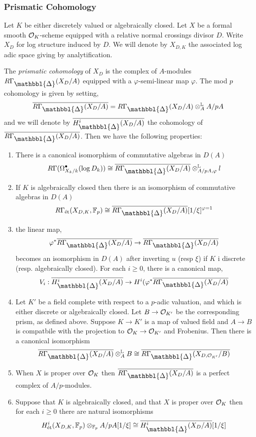 \documentclass[12pt]{article}
\newcommand{\Prism}{{\mathlarger{\mathbbl{\Delta}}}}
\begin{document}
\subsubsection{Prismatic Cohomology}

Let $K$ be either discretely valued or algebraically closed. Let $X$ be a formal smooth $\mathcal{O}_K$-scheme equipped with a relative normal crossings divisor $D$. Write $X_D$ for log structure induced by $D$. We will denote by $X_{D,K}$ the associated log adic space giving by analytification. 
\par 
The \textit{prismatic cohomology} of $X_D$ is the complex of $A$-modules $R \Gamma_{\Prism}(X_D/A)$ equipped with a $\varphi$-semi-linear map $\varphi$. The mod $p$ cohomology is given by setting,
\[ \ol{R \Gamma_{\Prism}(X_D/A)} = R \Gamma_{\Prism}(X_D/A) \ot_A^{\LL} A / p A \]
and we will denote by $\ol{H^i_{\Prism}(X_D/A)}$ the cohomology of $\ol{R \Gamma_{\Prism}(X_D/A)}$. Then we have the following properties:
\begin{enumerate}
\item There is a canonical isomorphism of commutative algebras in $D(A)$
\[ R \Gamma(\Omega^\bullet_{X_k/k}(\log{D_k})) \cong \ol{R \Gamma_{\Prism}(X_D/A)} \ot^{\LL}_{A/pA, \varphi} l \]
\item If $K$ is algebraically closed then there is an isomorphism of commutative algebras in $D(A)$
\[ R \Gamma_{\et}(X_{D,K}, \FF_p) \cong \ol{R \Gamma_{\Prism}(X_D/A)}[1/\xi]^{\varphi=1} \]
\item the linear map,
\[ \varphi^* \ol{R \Gamma_{\Prism}(X_D/A)} \to \ol{R \Gamma_{\Prism}(X_D/A)} \]
becomes an isomorphism in $D(A)$ after inverting $u$ (resp $\xi$) if $K$ i discrete (resp. algebraically closed). For each $i \ge 0$, there is a canonical map,
\[ V_i : \ol{H^i_{\Prism}(X_D/A)} \to H^i(\varphi^* \ol{R \Gamma_{\Prism}(X_D/A)} \]
\item Let $K'$ be a field complete with respect to a $p$-adic valuation, and which is either discrete or algebraically closed. Let $B \to \mathcal{O}_{K'}$ be the corresponding prism, as defined above. Suppose $K \to K'$ is a map of valued field and $A \to B$ is compatbile with the projection to $\mathcal{O}_K \to \mathcal{O}_{K'}$ and Frobenius. Then there is a canonical isomorphism
\[ \ol{R \Gamma_{\Prism}(X_D/A)} \ot_A^{\LL} B \cong \ol{R \Gamma_{\Prism}(X_{D, \cO_{K'}}/B)} \]
\item When $X$ is proper over $\mathcal{O}_K$ then $\ol{R \Gamma_{\Prism}(X_D/A)}$ is a perfect complex of $A/p$-modules.
\item Suppose that $K$ is algebraically closed, and that $X$ is proper over $\mathcal{O}_K$ then for each $i \ge 0$ there are natural isomorphisms
\[ H^i_{\et}(X_{D,K}, \FF_p) \ot_{\FF_p} A / p A[1/\xi] \cong \ol{H^i_{\Prism}(X_D/A)}[1/\xi] \]
\end{enumerate}
\end{document}
